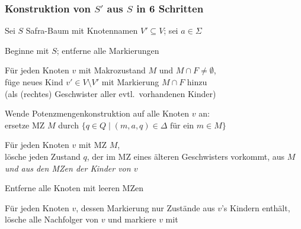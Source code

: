     \begin{frame}
      \frametitle{Konstruktion von $S'$ aus $S$ in 6 Schritten}

      Sei $S$ Safra-Baum mit Knotennamen $V' \subseteq V$; sei $a \in \Sigma$

      \begin{Enumerate}
        \item<+->
          Beginne mit $S$; entferne alle Markierungen \circled{!}
          \par%
        \item<+->
          Für jeden Knoten $v$ mit Makrozustand $M$ und $M \cap F \neq \emptyset$,\\
          füge neues Kind $v' \in V\setminus V'$ mit Markierung $M \cap F$ hinzu\\
          {\small (als  (rechtes) Geschwister aller evtl.\ vorhandenen Kinder)}
          \par%
        \item<+->
          Wende Potenzmengenkonstruktion auf alle Knoten $v$ an:\\
          ersetze MZ $M$ durch $\{q \in Q \mid (m,a,q) \in \Delta \text{~für ein~} m \in M\}$
          \par%
        \item<+->
          Für jeden Knoten $v$ mit MZ $M$,\\
          lösche jeden Zustand $q$, der im MZ eines älteren Geschwisters vorkommt,
          aus $M$ \emph{und aus den MZen der Kinder von $v$}
          \par%
        \item<+->
          Entferne alle Knoten mit leeren MZen
          \par%
        \item<+->
          Für jeden Knoten $v$, dessen Markierung nur Zustände aus $v$'s Kindern enthält,\\
          lösche alle Nachfolger von $v$ und markiere $v$ mit \circled{!}
      \end{Enumerate}

    \end{frame}

